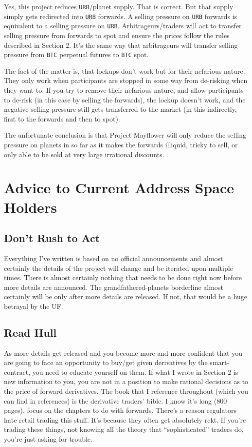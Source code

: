 \documentclass{article}
\begin{document}
	Yes, this project reduces \texttt{URB}/planet supply. That is correct. But that supply simply gets redirected into \texttt{URB} forwards. A selling pressure on \texttt{URB} forwards is equivalent to a selling pressure on \texttt{URB}. Arbitrageurs/traders will act to transfer selling pressure from forwards to spot and ensure the prices follow the rules described in Section 2. It's the same way that arbitrageurs will transfer selling pressure from \texttt{BTC} perpetual futures to \texttt{BTC} spot.
	
	The fact of the matter is, that lockups don't work but for their nefarious nature. They only work when participants are stopped in some way from de-risking when they want to. If you try to remove their nefarious nature, and allow participants to de-risk (in this case by selling the forwards), the lockup doesn't work, and the negative selling pressure still gets transferred to the market (in this indirectly, first to the forwards and then to spot).
	
	The unfortunate conclusion is that Project Mayflower will only reduce the selling pressure on planets in so far as it makes the forwards illiquid, tricky to sell, or only able to be sold at very large irrational discounts.
	
	\section{Advice to Current Address Space Holders}
	\subsection{Don't Rush to Act}
	Everything I've written is based on no official announcements and almost certainly the details of the project will change and be iterated upon multiple times. There is almost certainly nothing that needs to be done right now before more details are announced. The grandfathered-planets borderline almost certainly will be only after more details are released. If not, that would be a huge betrayal by the UF.
	
	\subsection{Read Hull}
	As more details get released and you become more and more confident that you are going to face an opportunity to buy/get given derivatives by the smart-contract, you need to educate yourself on them. If what I wrote in Section 2 is new information to you, you are not in a position to make rational decisions as to the price of forward derivatives. The book that I reference throughout (which you can find in references) is the derivative traders' bible. I know it's long (800 pages), focus on the chapters to do with forwards. There's a reason regulators hate retail trading this stuff. It's because they often get absolutely rekt. If you're trading these things, not knowing all the theory that ``sophisticated'' traders do, you're just asking for trouble.
	
\end{document}
